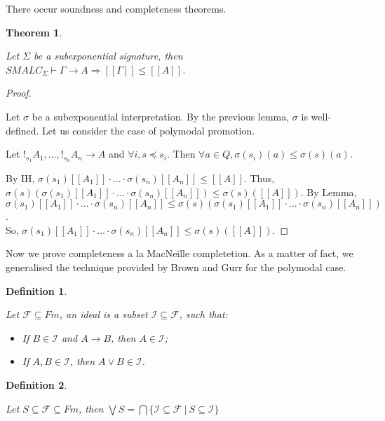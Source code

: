 \documentclass[a4paper]{article}
\theoremstyle{defin}
\newtheorem{defin}{Definition}
\theoremstyle{theorem}
\newtheorem{theorem}{Theorem}
\theoremstyle{prop}
\theoremstyle{lemma}
\theoremstyle{ex}
\theoremstyle{col}
\begin{document}
There occur soundness and completeness theorems.

\begin{theorem}
$ $

  Let $\Sigma$ be a subexponential signature, then
  $SMALC_{\Sigma} \vdash \Gamma \rightarrow A \Rightarrow [\![\Gamma]\!] \leq [\![A]\!]$.
\end{theorem}

\begin{proof}
  $ $

Let $\sigma$ be a subexponential interpretation. By the previous lemma, $\sigma$ is well-defined. Let us consider the case of polymodal promotion.

Let $!_{s_1} A_1, \dots, !_{s_n} A_n \rightarrow A$ and $\forall i, s \preceq s_i$. Then $\forall a \in Q, \sigma(s_i)(a) \leq \sigma(s)(a)$.

By IH, $\sigma(s_1)[\![A_1]\!] \cdot \dots \cdot \sigma(s_n) [\![A_n]\!] \leq [\![A]\!]$. Thus,
$\sigma(s)(\sigma(s_1)[\![A_1]\!] \cdot \dots \cdot \sigma(s_n) [\![A_n]\!]) \leq \sigma(s)([\![A]\!])$. By Lemma,
$\sigma(s_1)[\![A_1]\!] \cdot \dots \cdot \sigma(s_n) [\![A_n]\!] \leq \sigma(s)(\sigma(s_1)[\![A_1]\!] \cdot \dots \cdot
\sigma(s_n) [\![A_n]\!])$. \\
So, $\sigma(s_1)[\![A_1]\!] \cdot \dots \cdot \sigma(s_n) [\![A_n]\!] \leq \sigma(s)([\![A]\!])$.
\end{proof}

Now we prove completeness a la MacNeille completetion. As a matter of fact, we generalised the technique provided by Brown and Gurr for the polymodal case.

\begin{defin}
$ $

  Let $\mathcal{F} \subseteq Fm$, an ideal is a subset $\mathcal{I} \subseteq \mathcal{F}$, such that:

\begin{itemize}
  \item If $B \in \mathcal{I}$ and $A \rightarrow B$, then $A \in \mathcal{I}$;
  \item If $A, B \in \mathcal{I}$, then $A \lor B \in \mathcal{I}$.
\end{itemize}
\end{defin}

\begin{defin}
$ $

  Let $S \subseteq \mathcal{F} \subseteq Fm$,
  then $\bigvee S = \bigcap \{ \mathcal{I} \subseteq \mathcal{F} \: | \: S \subseteq \mathcal{I} \}$
\end{defin}
\end{document}
